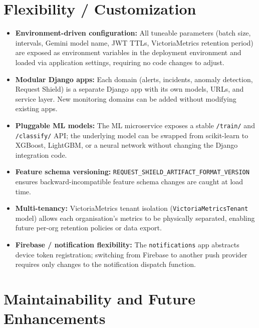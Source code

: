 \section{Flexibility / Customization}

\begin{itemize}
  \item \textbf{Environment-driven configuration:} All tuneable parameters
        (batch size, intervals, Gemini model name, JWT TTLs, VictoriaMetrics
        retention period) are exposed as environment variables in
        the deployment environment and loaded via application settings, requiring
        no code changes to adjust.
  \item \textbf{Modular Django apps:} Each domain (alerts, incidents,
        anomaly detection, Request Shield) is a separate Django app with its
        own models, URLs, and service layer.  New monitoring domains can be
        added without modifying existing apps.
  \item \textbf{Pluggable ML models:} The ML microservice exposes a stable
        \texttt{/train/} and \texttt{/classify/} API; the underlying model
        can be swapped from scikit-learn to XGBoost, LightGBM, or a neural
        network without changing the Django integration code.
  \item \textbf{Feature schema versioning:}
        \texttt{REQUEST\_SHIELD\_ARTIFACT\_FORMAT\_VERSION} ensures
        backward-incompatible feature schema changes are caught at load time.
  \item \textbf{Multi-tenancy:} VictoriaMetrics tenant isolation
        (\texttt{VictoriaMetricsTenant} model) allows each organisation's
        metrics to be physically separated, enabling future per-org retention
        policies or data export.
  \item \textbf{Firebase / notification flexibility:} The
        \texttt{notifications} app abstracts device token registration;
        switching from Firebase to another push provider requires only
        changes to the notification dispatch function.
\end{itemize}

\section{Maintainability and Future Enhancements}

